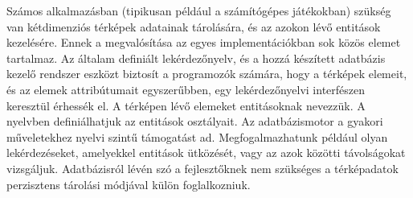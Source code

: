 
Számos alkalmazásban (tipikusan például a számítógépes játékokban) szükség  van kétdimenziós térképek adatainak tárolására, és az azokon lévő entitások kezelésére. Ennek a megvalósítása az egyes implementációkban sok közös elemet tartalmaz. Az általam definiált lekérdezőnyelv, és a hozzá készített adatbázis kezelő rendszer eszközt biztosít a programozók számára, hogy a térképek elemeit, és az elemek attribútumait egyszerűbben, egy lekérdezőnyelvi interfészen keresztül érhessék el. A térképen lévő elemeket entitásoknak nevezzük. A nyelvben definiálhatjuk az entitások osztályait. Az adatbázismotor a gyakori műveletekhez nyelvi szintű támogatást ad. Megfogalmazhatunk például olyan lekérdezéseket, amelyekkel entitások ütközését, vagy az azok közötti távolságokat vizsgáljuk. Adatbázisról lévén szó a fejlesztőknek nem szükséges a térképadatok perzisztens tárolási módjával külön foglalkozniuk.